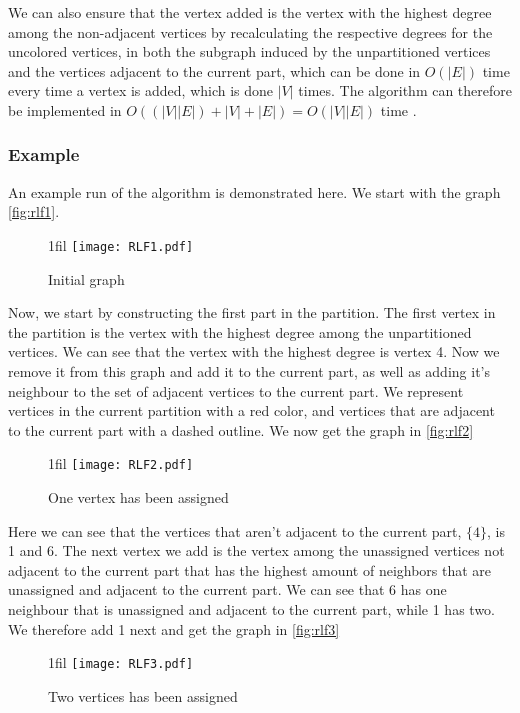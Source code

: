 \documentclass[a4paper]{article}
\makeatletter
\newcommand*{\centerfloat}{%
  \parindent \z@
  \leftskip \z@ \@plus 1fil \@minus \textwidth
  \rightskip\leftskip
  \parfillskip \z@skip}
\makeatother
\begin{document}
We can also ensure that the vertex added is the vertex with the highest degree among
the non-adjacent vertices by recalculating the respective degrees for the
uncolored vertices, in both the subgraph induced by the unpartitioned vertices and the vertices 
adjacent to the current part, which can be done in $O(|E|)$ time every time a vertex is
added, which is done $|V|$ times. The algorithm can therefore be implemented in
$O((|V||E|)+|V|+|E|) = O(|V||E|)$ time \cite{Constructive}.

\subsubsection{Example}

An example run of the algorithm is demonstrated here. We start with the graph 
\autoref{fig:rlf1}.

\begin{figure}[H]
    \centerfloat
    \texttt{[image: RLF1.pdf]}
    \caption{Initial graph}
    \label{fig:rlf1}
\end{figure}

Now, we start by constructing the first part in the partition. The first vertex
in the partition is the vertex with the highest degree among the unpartitioned
vertices. We can see that the
vertex with the highest degree is vertex 4. Now we remove it from this graph
and add it to the current part, as well as adding it's neighbour to the set
of adjacent vertices to the current part. We represent vertices in the current
partition with a red color, and vertices that are adjacent to the current part
with a dashed outline. We now get the graph in \autoref{fig:rlf2}

\begin{figure}[H]
    \centerfloat
    \texttt{[image: RLF2.pdf]}
    \caption{One vertex has been assigned}
    \label{fig:rlf2}
\end{figure}

Here we can see that the vertices that aren't adjacent to the current part,
$\{4\}$, is 1 and 6. The next vertex we add is the vertex among the unassigned
vertices not adjacent to the current part that has the
highest amount of neighbors that are unassigned and adjacent to the current
part. We can see that 6 has one neighbour that is unassigned and adjacent to the
current part, while 1 has two. We therefore add 1 next and get the graph in
\autoref{fig:rlf3}

\begin{figure}[H]
    \centerfloat
    \texttt{[image: RLF3.pdf]}
    \caption{Two vertices has been assigned}
    \label{fig:rlf3}
\end{figure}
\end{document}

